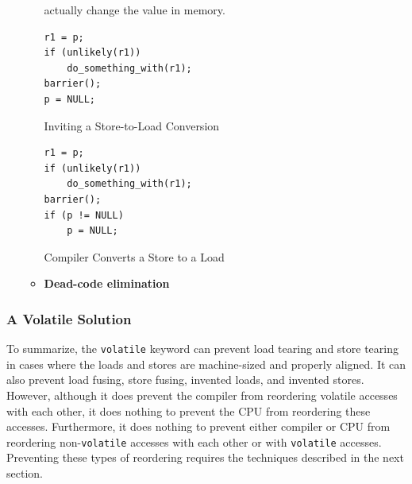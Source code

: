 \documentclass[11pt]{article}
\begin{document}
\begin{itemize}
\begin{itemize}
actually change the value in memory.
\begin{listing}[htbp]
\begin{verbatim}
r1 = p;
if (unlikely(r1))
    do_something_with(r1);
barrier();
p = NULL;
\end{verbatim}
\caption{\label{l4.22}Inviting a Store-to-Load Conversion}
\end{listing}
\begin{listing}[htbp]
\begin{verbatim}
r1 = p;
if (unlikely(r1))
    do_something_with(r1);
barrier();
if (p != NULL)
    p = NULL;
\end{verbatim}
\caption{\label{l4.23}Compiler Converts a Store to a Load}
\end{listing}
\item \textbf{Dead-code elimination}
\end{itemize}
\end{itemize}
\subsubsection{A Volatile Solution}
\label{sec:org9874020}
To summarize, the \texttt{volatile} keyword can prevent load tearing and store tearing in cases where the loads
and stores are machine-sized and properly aligned. It can also prevent load fusing, store fusing,
invented loads, and invented stores. However, although it does prevent the compiler from reordering
volatile accesses with each other, it does nothing to prevent the CPU from reordering these accesses.
Furthermore, it does nothing to prevent either compiler or CPU from reordering non-\texttt{volatile} accesses
with each other or with \texttt{volatile} accesses. Preventing these types of reordering requires the techniques described in the next section.
\end{document}
